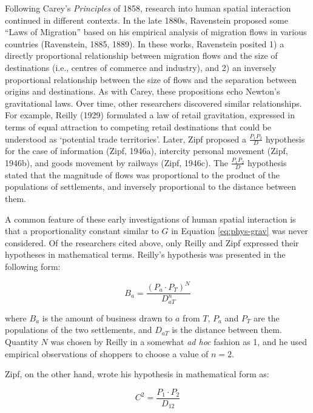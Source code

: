 \documentclass[
11pt, %
oneside, %
english, %
singlespacing, %
]{macthesis} %
\begin{document}
Following Carey's \emph{Principles} of 1858, research into human spatial interaction continued in different contexts. In the late 1880s, Ravenstein proposed some ``Laws of Migration'' based on his empirical analysis of migration flows in various countries (Ravenstein, 1885, 1889). In these works, Ravenstein posited 1) a directly proportional relationship between migration flows and the size of destinations (i.e., centres of commerce and industry), and 2) an inversely proportional relationship between the size of flows and the separation between origins and destinations. As with Carey, these propositions echo Newton's gravitational laws. Over time, other researchers discovered similar relationships. For example, Reilly (1929) formulated a law of retail gravitation, expressed in terms of equal attraction to competing retail destinations that could be understood as `potential trade territories'. Later, Zipf proposed a \(\frac{P_1P_2}{D}\) hypothesis for the case of information (Zipf, 1946a), intercity personal movement (Zipf, 1946b), and goods movement by railways (Zipf, 1946c). The \(\frac{P_1P_2}{D}\) hypothesis stated that the magnitude of flows was proportional to the product of the populations of settlements, and inversely proportional to the distance between them.

A common feature of these early investigations of human spatial interaction is that a proportionality constant similar to \(G\) in Equation \ref{eq:phys-grav} was never considered. Of the researchers cited above, only Reilly and Zipf expressed their hypotheses in mathematical terms. Reilly's hypothesis was presented in the following form:

\begin{equation}
\label{eq:reilly}
B_a = \frac{(P_a\cdot P_T)^N}{D_{aT}^n}
\end{equation} 

\noindent where \(B_a\) is the amount of business drawn to \(a\) from \(T\), \(P_a\) and \(P_T\) are the populations of the two settlements, and \(D_{aT}\) is the distance between them. Quantity \(N\) was chosen by Reilly in a somewhat \emph{ad hoc} fashion as 1, and he used empirical observations of shoppers to choose a value of \(n = 2\).

Zipf, on the other hand, wrote his hypothesis in mathematical form as:

\begin{equation}
\label{eq:zipf}
C^2 = \frac{P_1\cdot P_2}{D_{12}}
\end{equation} 
\end{document}
